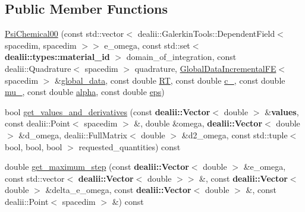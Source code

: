 \subsection*{Public Member Functions}
\begin{DoxyCompactItemize}
\item 
\hyperlink{classincremental_f_e_1_1_psi_chemical00_a2c70852c04aaa0f530c705965671f3ff}{Psi\+Chemical00} (const std\+::vector$<$ dealii\+::\+Galerkin\+Tools\+::\+Dependent\+Field$<$ spacedim, spacedim $>$$>$ e\+\_\+omega, const std\+::set$<$ {\bf dealii\+::types\+::material\+\_\+id} $>$ domain\+\_\+of\+\_\+integration, const dealii\+::\+Quadrature$<$ spacedim $>$ quadrature, \hyperlink{classincremental_f_e_1_1_global_data_incremental_f_e}{Global\+Data\+Incremental\+FE}$<$ spacedim $>$ \&\hyperlink{classincremental_f_e_1_1_psi_3_01spacedim_00_01spacedim_01_4_abf0a4804877fd7cc9bd1b90e52760ba9}{global\+\_\+data}, const double \hyperlink{classincremental_f_e_1_1_psi_chemical00_ad2500e079225b055e821ecc9e4baf3b6}{RT}, const double \hyperlink{classincremental_f_e_1_1_psi_chemical00_a2ad0343d949c11ca7ce23618939a623b}{c\+\_}, const double \hyperlink{classincremental_f_e_1_1_psi_chemical00_a3c264a3e33072def54f2376ee9a0b4ea}{mu\+\_}, const double \hyperlink{classincremental_f_e_1_1_psi_3_01spacedim_00_01spacedim_01_4_af7b8227188dbdd6ada35b9445d96c79d}{alpha}, const double \hyperlink{classincremental_f_e_1_1_psi_chemical00_a8016f9e379c596ca0ed60479110a3178}{eps})
\item 
bool \hyperlink{classincremental_f_e_1_1_psi_chemical00_a3d389bfb7281b23f250fc23fca216c99}{get\+\_\+values\+\_\+and\+\_\+derivatives} (const {\bf dealii\+::\+Vector}$<$ double $>$ \&{\bf values}, const dealii\+::\+Point$<$ spacedim $>$ \&, double \&omega, {\bf dealii\+::\+Vector}$<$ double $>$ \&d\+\_\+omega, dealii\+::\+Full\+Matrix$<$ double $>$ \&d2\+\_\+omega, const std\+::tuple$<$ bool, bool, bool $>$ requested\+\_\+quantities) const 
\item 
double \hyperlink{classincremental_f_e_1_1_psi_chemical00_ad1cafebc95e211956f5a1db4a58019eb}{get\+\_\+maximum\+\_\+step} (const {\bf dealii\+::\+Vector}$<$ double $>$ \&e\+\_\+omega, const std\+::vector$<$ {\bf dealii\+::\+Vector}$<$ double $>$$>$ \&, const {\bf dealii\+::\+Vector}$<$ double $>$ \&delta\+\_\+e\+\_\+omega, const {\bf dealii\+::\+Vector}$<$ double $>$ \&, const dealii\+::\+Point$<$ spacedim $>$ \&) const 
\end{DoxyCompactItemize}
